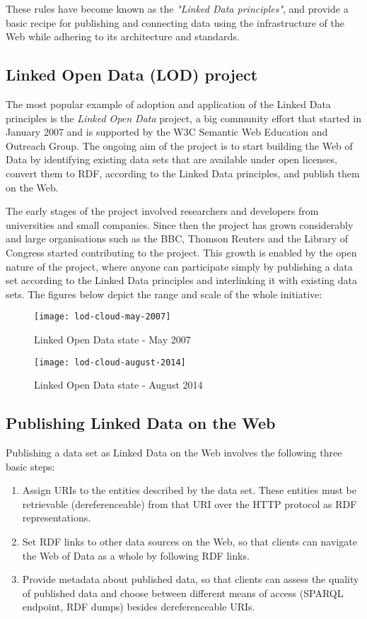 These rules have become known as the \textit{"Linked Data principles"}, and provide a basic recipe for publishing and connecting data using the infrastructure of the Web while adhering to its architecture and standards.

\subsection{Linked Open Data (LOD) project}

The most popular example of adoption and application of the Linked Data principles is
the \textit{Linked Open Data} project, a big community effort that started in January
2007 and is supported by the W3C Semantic Web Education and Outreach Group. The ongoing aim of the project is to start building the Web of Data by identifying existing data sets that are available under open licenses, convert them to RDF, according to the Linked Data principles, and publish them on the Web.

The early stages of the project involved researchers and developers from universities and small companies. Since then the project has grown
considerably and large organisations such as the BBC, Thomson Reuters and the Library of Congress started contributing to the project. This growth is enabled by the open nature of the project, where anyone can participate simply by publishing a data set according to the Linked Data principles and interlinking it with existing data sets. The figures below depict the range and scale of the whole initiative: 

\begin{figure}[h!]
    \texttt{[image: lod-cloud-may-2007]}
    \caption{Linked Open Data state - May 2007}
    \label{fig:view}
\end{figure}

\begin{figure}[h!]
    \texttt{[image: lod-cloud-august-2014]}
    \caption{Linked Open Data state - August 2014}
    \label{fig:view}
\end{figure}

\subsection{Publishing Linked Data on the Web}
Publishing a data set as Linked Data on the Web involves the following three basic steps:
\begin{enumerate}
    \item Assign URIs to the entities described by the data set. These entities must be retrievable (dereferenceable) from that URI over the HTTP protocol as RDF representations.
    \item Set RDF links to other data sources on the Web, so that clients can navigate the Web of
    Data as a whole by following RDF links.
    \item Provide metadata about published data, so that clients can assess the quality of published data and choose between different means of access (SPARQL endpoint, RDF dumps) besides dereferenceable URIs.
\end{enumerate}

